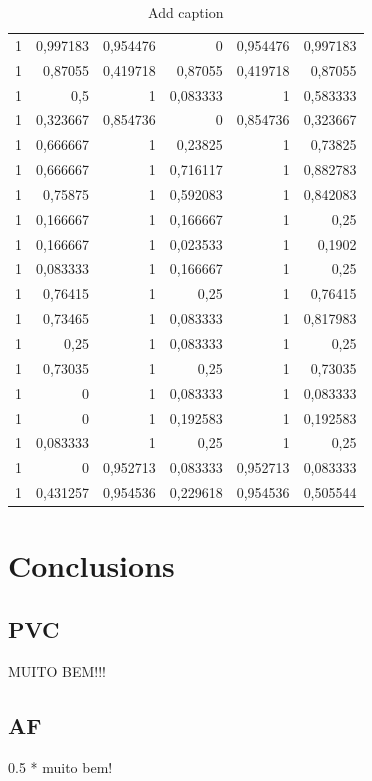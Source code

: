 \documentclass[a4paper,titlepage]{article}
\begin{document}
\begin{table}[htbp]
  \centering
  \caption{Add caption}
    \begin{tabular}{rrrrrr}
    1     & 0,997183 & 0,954476 & 0     & 0,954476 & 0,997183 \\
    1     & 0,87055 & 0,419718 & 0,87055 & 0,419718 & 0,87055 \\
    1     & 0,5   & 1     & 0,083333 & 1     & 0,583333 \\
    1     & 0,323667 & 0,854736 & 0     & 0,854736 & 0,323667 \\
    1     & 0,666667 & 1     & 0,23825 & 1     & 0,73825 \\
    1     & 0,666667 & 1     & 0,716117 & 1     & 0,882783 \\
    1     & 0,75875 & 1     & 0,592083 & 1     & 0,842083 \\
    1     & 0,166667 & 1     & 0,166667 & 1     & 0,25 \\
    1     & 0,166667 & 1     & 0,023533 & 1     & 0,1902 \\
    1     & 0,083333 & 1     & 0,166667 & 1     & 0,25 \\
    1     & 0,76415 & 1     & 0,25  & 1     & 0,76415 \\
    1     & 0,73465 & 1     & 0,083333 & 1     & 0,817983 \\
    1     & 0,25  & 1     & 0,083333 & 1     & 0,25 \\
    1     & 0,73035 & 1     & 0,25  & 1     & 0,73035 \\
    1     & 0     & 1     & 0,083333 & 1     & 0,083333 \\
    1     & 0     & 1     & 0,192583 & 1     & 0,192583 \\
    1     & 0,083333 & 1     & 0,25  & 1     & 0,25 \\
    1     & 0     & 0,952713 & 0,083333 & 0,952713 & 0,083333 \\
    1     & 0,431257 & 0,954536 & 0,229618 & 0,954536 & 0,505544 \\
    \end{tabular}%
  \label{tab:addlabel}%
\end{table}%



\section{Conclusions}

\subsection{PVC}
MUITO BEM!!!

\subsection{AF}
0.5 * muito bem!
\end{document}
